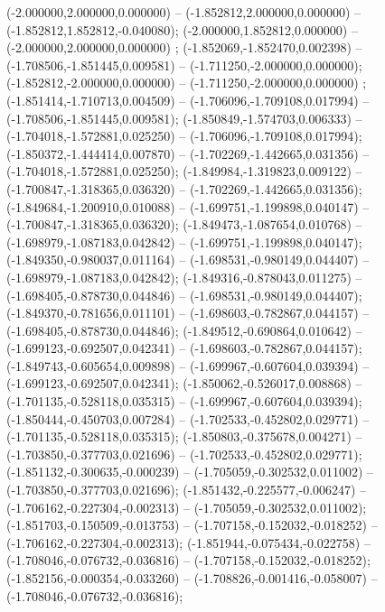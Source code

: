  (-2.000000,2.000000,0.000000) -- (-1.852812,2.000000,0.000000) -- (-1.852812,1.852812,-0.040080);
 (-2.000000,1.852812,0.000000) -- (-2.000000,2.000000,0.000000) ;
 (-1.852069,-1.852470,0.002398) -- (-1.708506,-1.851445,0.009581) -- (-1.711250,-2.000000,0.000000);
 (-1.852812,-2.000000,0.000000) -- (-1.711250,-2.000000,0.000000) ;
 (-1.851414,-1.710713,0.004509) -- (-1.706096,-1.709108,0.017994) -- (-1.708506,-1.851445,0.009581);
 (-1.850849,-1.574703,0.006333) -- (-1.704018,-1.572881,0.025250) -- (-1.706096,-1.709108,0.017994);
 (-1.850372,-1.444414,0.007870) -- (-1.702269,-1.442665,0.031356) -- (-1.704018,-1.572881,0.025250);
 (-1.849984,-1.319823,0.009122) -- (-1.700847,-1.318365,0.036320) -- (-1.702269,-1.442665,0.031356);
 (-1.849684,-1.200910,0.010088) -- (-1.699751,-1.199898,0.040147) -- (-1.700847,-1.318365,0.036320);
 (-1.849473,-1.087654,0.010768) -- (-1.698979,-1.087183,0.042842) -- (-1.699751,-1.199898,0.040147);
 (-1.849350,-0.980037,0.011164) -- (-1.698531,-0.980149,0.044407) -- (-1.698979,-1.087183,0.042842);
 (-1.849316,-0.878043,0.011275) -- (-1.698405,-0.878730,0.044846) -- (-1.698531,-0.980149,0.044407);
 (-1.849370,-0.781656,0.011101) -- (-1.698603,-0.782867,0.044157) -- (-1.698405,-0.878730,0.044846);
 (-1.849512,-0.690864,0.010642) -- (-1.699123,-0.692507,0.042341) -- (-1.698603,-0.782867,0.044157);
 (-1.849743,-0.605654,0.009898) -- (-1.699967,-0.607604,0.039394) -- (-1.699123,-0.692507,0.042341);
 (-1.850062,-0.526017,0.008868) -- (-1.701135,-0.528118,0.035315) -- (-1.699967,-0.607604,0.039394);
 (-1.850444,-0.450703,0.007284) -- (-1.702533,-0.452802,0.029771) -- (-1.701135,-0.528118,0.035315);
 (-1.850803,-0.375678,0.004271) -- (-1.703850,-0.377703,0.021696) -- (-1.702533,-0.452802,0.029771);
 (-1.851132,-0.300635,-0.000239) -- (-1.705059,-0.302532,0.011002) -- (-1.703850,-0.377703,0.021696);
 (-1.851432,-0.225577,-0.006247) -- (-1.706162,-0.227304,-0.002313) -- (-1.705059,-0.302532,0.011002);
 (-1.851703,-0.150509,-0.013753) -- (-1.707158,-0.152032,-0.018252) -- (-1.706162,-0.227304,-0.002313);
 (-1.851944,-0.075434,-0.022758) -- (-1.708046,-0.076732,-0.036816) -- (-1.707158,-0.152032,-0.018252);
 (-1.852156,-0.000354,-0.033260) -- (-1.708826,-0.001416,-0.058007) -- (-1.708046,-0.076732,-0.036816);
